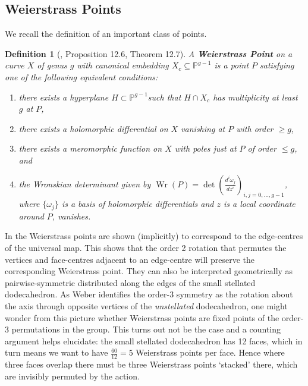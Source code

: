 \documentclass{amsart}
\newtheorem{definition}[theorem]{Definition}
\newcommand{\bam}[1]{\textbf{#1}}
\newcommand{\pround}[1]{\left( #1 \right)}
\begin{document}
\subsection{Weierstrass Points}\label{subsec: Weierstrass points}
We recall the definition of an important class of points.
\begin{definition}[\cite{McMullen2014}, Proposition 12.6, Theorem 12.7]\label{def: Weierstrass points}
A \bam{Weierstrass Point} on a curve $X$ of genus $g$ with canonical embedding $X_{c} \subseteq \mathbb{P}^{g-1}$ is a point $P$ satisfying one of the following equivalent conditions:
\begin{enumerate}
    \item there exists a hyperplane $H \subset \mathbb{P}^{g-1}$such that $H \cap X_c$ has multiplicity at least $g$ at $P$,
    \item there exists a holomorphic differential on $X$ vanishing at $P$ with order $\geq g$, 
    \item there exists a meromorphic function on $X$ with poles just at $P$ of order $\leq g$, and 
    \item the Wronskian determinant given by $\operatorname{Wr}(P) = \det \pround{\frac{d^i \omega_j}{dz^i}}_{i,j = 0, \dots, g-1}$, where $\{ \omega_j \}$ is a basis of holomorphic differentials and $z$ is a local coordinate around $P$, vanishes.
\end{enumerate}
\end{definition}
In \cite{Singerman1997} the Weierstrass points are shown (implicitly) to correspond to the edge-centres of the universal map. This shows that the order 2 rotation that permutes the vertices and face-centres adjacent to an edge-centre will preserve the corresponding Weierstrass point. They can also be interpreted geometrically as pairwise-symmetric distributed along the edges of the small stellated dodecahedron. As Weber identifies the order-3 symmetry as the rotation about the axis through opposite vertices of the \textit{unstellated} dodecahedron, one might wonder from this picture whether Weierstrass points are fixed points of the order-3 permutations in the group.  This turns out not be the case and a counting argument helps elucidate: the small stellated dodecahedron has 12 faces, which in turn means we want to have $\frac{60}{12}=5$ Weierstrass points per face. Hence where three faces overlap there must be three Weierstrass points `stacked' there, which are invisibly permuted by the action.
\end{document}
